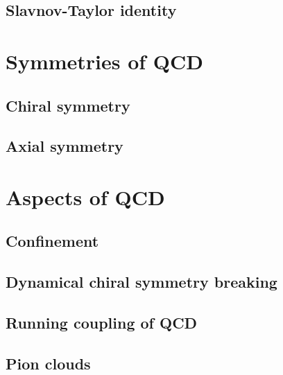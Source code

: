 	\subsection{Slavnov-Taylor identity}
	
\section{Symmetries of QCD}
	\subsection{Chiral symmetry}
	\subsection{Axial symmetry}
	
\section{Aspects of QCD}
	\subsection{Confinement}
	\subsection{Dynamical chiral symmetry breaking}
	\subsection{Running coupling of QCD}
	\subsection{Pion clouds}